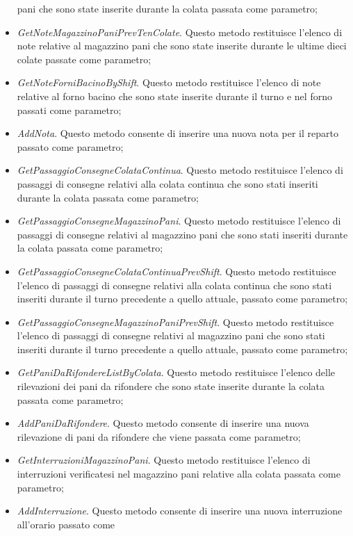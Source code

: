 \begin{itemize}
    pani che sono state inserite durante la colata passata come parametro;
    \item \textit{GetNoteMagazzinoPaniPrevTenColate}. Questo metodo restituisce l'elenco di note relative al magazzino
    pani che sono state inserite durante le ultime dieci colate passate come parametro;
    \item \textit{GetNoteForniBacinoByShift}. Questo metodo restituisce l'elenco di note relative al forno bacino che
    sono state inserite durante il turno e nel forno passati come parametro;
    \item \textit{AddNota}. Questo metodo consente di inserire una nuova nota per il reparto passato come parametro;
    \item \textit{GetPassaggioConsegneColataContinua}. Questo metodo restituisce l'elenco di passaggi di consegne
    relativi alla colata continua che sono stati inseriti durante la colata passata come parametro;
    \item \textit{GetPassaggioConsegneMagazzinoPani}. Questo metodo restituisce l'elenco di passaggi di consegne
    relativi al magazzino pani che sono stati inseriti durante la colata passata come parametro;
    \item \textit{GetPassaggioConsegneColataContinuaPrevShift}. Questo metodo restituisce l'elenco di passaggi di
    consegne relativi alla colata continua che sono stati inseriti durante il turno precedente a quello attuale,
    passato come parametro;
    \item \textit{GetPassaggioConsegneMagazzinoPaniPrevShift}. Questo metodo restituisce l'elenco di passaggi di
    consegne relativi al magazzino pani che sono stati inseriti durante il turno precedente a quello attuale,
    passato come parametro;
    \item \textit{GetPaniDaRifondereListByColata}. Questo metodo restituisce l'elenco delle rilevazioni dei pani da
    rifondere che sono state inserite durante la colata passata come parametro;
    \item \textit{AddPaniDaRifondere}. Questo metodo consente di inserire una nuova rilevazione di pani da rifondere
    che viene passata come parametro;
    \item \textit{GetInterruzioniMagazzinoPani}. Questo metodo restituisce l'elenco di interruzioni verificatesi nel
    magazzino pani relative alla colata passata come parametro;
    \item \textit{AddInterruzione}. Questo metodo consente di inserire una nuova interruzione all'orario passato come

\end{itemize}
